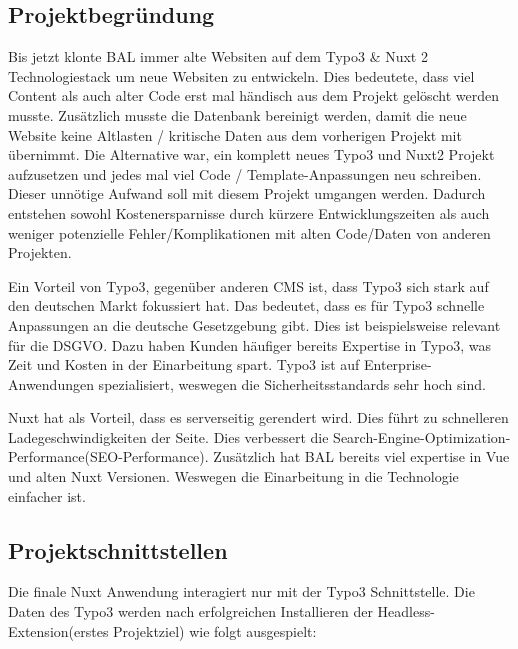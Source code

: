\subsection{Projektbegründung} 
\label{sec:Projektbegruendung}
Bis jetzt klonte \acs{BAL} immer alte Websiten auf dem Typo3 \& Nuxt 2 Technologiestack um neue Websiten zu entwickeln. Dies bedeutete, dass viel Content als auch alter Code erst mal händisch aus dem Projekt gelöscht werden musste. Zusätzlich musste die Datenbank bereinigt werden, damit die neue Website keine Altlasten / kritische Daten aus dem vorherigen Projekt mit übernimmt. Die Alternative war, ein komplett neues Typo3 und Nuxt2 Projekt aufzusetzen und jedes mal viel Code / Template-Anpassungen neu schreiben. Dieser unnötige Aufwand soll mit diesem Projekt umgangen werden. Dadurch entstehen sowohl Kostenersparnisse durch kürzere Entwicklungszeiten als auch weniger potenzielle Fehler/Komplikationen mit alten Code/Daten von anderen Projekten.

Ein Vorteil von Typo3, gegenüber anderen \acs{CMS} ist, dass Typo3 sich stark auf den deutschen Markt fokussiert hat. Das bedeutet, dass es für Typo3 schnelle Anpassungen an die deutsche Gesetzgebung gibt. Dies ist beispielsweise relevant für die \acs{DSGVO}. Dazu haben Kunden häufiger bereits Expertise in Typo3, was Zeit und Kosten in der Einarbeitung spart. Typo3 ist auf Enterprise-Anwendungen spezialisiert, weswegen die Sicherheitsstandards sehr hoch sind.

Nuxt hat als Vorteil, dass es serverseitig gerendert wird. Dies führt zu schnelleren Ladegeschwindigkeiten der Seite. Dies verbessert die Search-Engine-Optimization-Performance(\acs{SEO}-Performance). Zusätzlich hat \acs{BAL} bereits viel expertise in Vue und alten Nuxt Versionen. Weswegen die Einarbeitung in die Technologie einfacher ist.

\subsection{Projektschnittstellen} 
\label{sec:Projektschnittstellen}

Die finale Nuxt Anwendung interagiert nur mit der Typo3 Schnittstelle. Die Daten des Typo3 werden nach erfolgreichen Installieren der Headless-Extension(erstes Projektziel) wie folgt ausgespielt:

